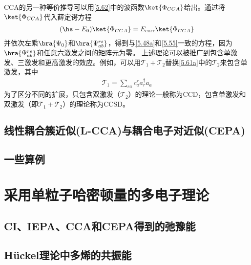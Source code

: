 CCA的另一种等价推导可以用\autoref{5.62}中的波函数$\ket{\Phi_{CCA}}$给出。通过将$\ket{\Phi_{CCA}}$代入薛定谔方程
\begin{align*}
    (\hs-E_0)\ket{\Phi_{CCA}}=E_{\text{corr}}\ket{\Phi_{CCA}}
\end{align*}
并依次左乘$\bra{\Psi_0}$和$\bra{\Psi^{rs}_{ab}}$，得到与\autoref{5.48a}和\autoref{5.55}一致的方程，因为$\bra{\Psi^{rs}_{ab}}$和任意六激发之间的矩阵元为零。
上述理论可以被推广到包含单激发、三激发和更高激发的效应。例如，可以用$\mathscr{T}_1+\mathscr{T}_2$替换\autoref{5.61a}中的$\mathscr{T}_2$来包含单激发，其中
\begin{align*}
    \mathscr{T}_1=\sum_{ra}c^r_aa^{\dagger}_ra_a
\end{align*}
为了区分不同的扩展，只包含双激发（$\mathscr{T}_2$）的理论一般称为CCD，包含单激发和双激发（即$\mathscr{T}_1+\mathscr{T}_2$）的理论称为CCSD。
\subsection{线性耦合簇近似(L-CCA)与耦合电子对近似(CEPA)}\label{sec5.2.3}
\subsection{一些算例}

\section{采用单粒子哈密顿量的多电子理论}
\subsection{CI、IEPA、CCA和CEPA得到的弛豫能}
\subsection{H\"uckel理论中多烯的共振能}

\theendnotes